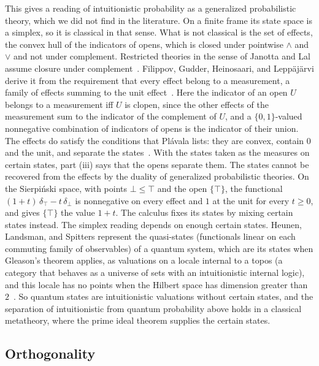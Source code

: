 This gives a reading of intuitionistic probability as a generalized
probabilistic theory, which we did not find in the literature. On a
finite frame its state space is a simplex, so it is classical in that
sense. What is not classical is the set of effects, the convex hull of
the indicators of opens, which is closed under pointwise $\wedge$ and
$\vee$ and not under complement. Restricted theories in the sense of
Janotta and Lal assume closure under complement~\cite{janotta-lal2013}.
Filippov, Gudder, Heinosaari, and Leppäjärvi derive it from the
requirement that every effect belong to a measurement, a family of
effects summing to the unit effect~\cite{filippov2020}. Here the
indicator of an open $U$ belongs to a measurement iff $U$ is clopen,
since the other effects of the measurement sum to the indicator of the
complement of $U$, and a $\{0,1\}$-valued nonnegative combination of
indicators of opens is the indicator of their union. The
effects do satisfy the conditions that Plávala lists: they are convex,
contain $0$ and the unit, and separate the states~\cite{plavala2023}.
With the states taken as the measures on certain states, part (iii) says
that the opens separate them. The states cannot be recovered from the
effects by the duality of generalized probabilistic theories. On the
Sierpiński space, with points $\bot \le \top$ and the open $\{\top\}$,
the functional $(1 + t)\,\delta_{\top} - t\,\delta_{\bot}$ is nonnegative on
every effect and $1$ at the unit for every $t \ge 0$, and gives
$\{\top\}$ the value $1 + t$. The calculus fixes its states by mixing
certain states instead.
The simplex reading depends on enough certain
states. Heunen, Landsman, and Spitters represent the quasi-states
(functionals linear on each commuting family of observables) of a
quantum system, which are its states when Gleason's theorem applies, as
valuations on a locale internal to a topos (a category that behaves as a
universe of sets with an intuitionistic internal logic), and this locale has no
points when the Hilbert space has dimension greater than
$2$~\cite{heunen-landsman-spitters2009}. So quantum states are
intuitionistic valuations without certain states, and the separation of
intuitionistic from quantum probability above holds in a classical
metatheory, where the prime ideal theorem supplies the certain states.

\subsection{Orthogonality}
\label{sec:cat-orth}

